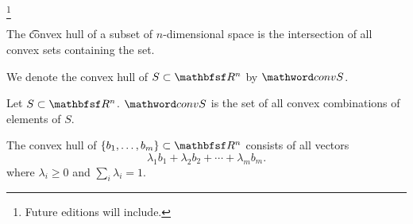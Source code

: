 
\footnote{Future editions will include.}


The \t{convex hull} of a subset of $n$-dimensional space is the intersection of all convex sets containing the set.


We denote the convex hull of $S \subset \R^n$ by $\conv S$.



\begin{prop}
  Let $S \subset \R^n$. $\conv S$ is the set of all convex combinations of elements of $S$.
\end{prop}

\begin{prop}
  The convex hull of $\set{b_1, \dots, b_m} \subset \R^n$ consists of all vectors
  $$
    \lambda_1b_1 + \lambda_2b_2 + \cdots + \lambda_mb_m.
  $$
  where $\lambda_i \geq 0$ and $\sum_{i}\lambda_i = 1$.
\end{prop}

\blankpage
